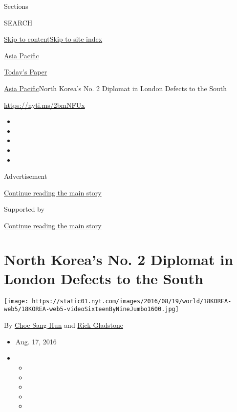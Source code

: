 Sections

SEARCH

\protect\hyperlink{site-content}{Skip to
content}\protect\hyperlink{site-index}{Skip to site index}

\href{https://www.nytimes.com/section/world/asia}{Asia Pacific}

\href{https://myaccount.nytimes.com/auth/login?response_type=cookie\&client_id=vi}{}

\href{https://www.nytimes.com/section/todayspaper}{Today's Paper}

\href{/section/world/asia}{Asia Pacific}\textbar{}North Korea's No. 2
Diplomat in London Defects to the South

\url{https://nyti.ms/2bmNFUx}

\begin{itemize}
\item
\item
\item
\item
\item
\end{itemize}

Advertisement

\protect\hyperlink{after-top}{Continue reading the main story}

Supported by

\protect\hyperlink{after-sponsor}{Continue reading the main story}

\hypertarget{north-koreas-no-2-diplomat-in-london-defects-to-the-south}{%
\section{North Korea's No. 2 Diplomat in London Defects to the
South}\label{north-koreas-no-2-diplomat-in-london-defects-to-the-south}}

\texttt{[image: https://static01.nyt.com/images/2016/08/19/world/18KOREA-web5/18KOREA-web5-videoSixteenByNineJumbo1600.jpg]}

By \href{http://www.nytimes.com/by/choe-sang-hun}{Choe Sang-Hun} and
\href{https://www.nytimes.com/by/rick-gladstone}{Rick Gladstone}

\begin{itemize}
\item
  Aug. 17, 2016
\item
  \begin{itemize}
  \item
  \item
  \item
  \item
  \item
  \end{itemize}
\end{itemize}

